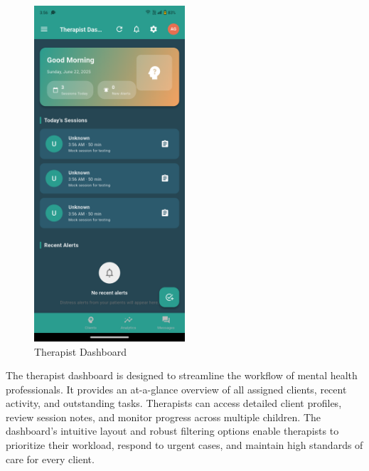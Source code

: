 ﻿\documentclass[12pt,a4paper]{article}
\begin{document}
\begin{figure}[H]
    \centering
    \includegraphics[width=0.5\textwidth]{Screenshots/therapistdashboard.png}
    \caption{Therapist Dashboard}
    \label{fig:therapist-dashboard}
\end{figure}
The therapist dashboard is designed to streamline the workflow of mental health professionals. It provides an at-a-glance overview of all assigned clients, recent activity, and outstanding tasks. Therapists can access detailed client profiles, review session notes, and monitor progress across multiple children. The dashboard's intuitive layout and robust filtering options enable therapists to prioritize their workload, respond to urgent cases, and maintain high standards of care for every client.
\end{document}
